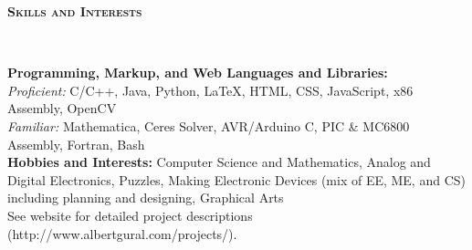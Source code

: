 \documentclass{article}
\newenvironment{changemargin}[2]{%
  \begin{list}{}{%
    \setlength{\topsep}{0pt}%
    \setlength{\leftmargin}{#1}%
    \setlength{\rightmargin}{#2}%
    \setlength{\listparindent}{\parindent}%
    \setlength{\itemindent}{\parindent}%
    \setlength{\parsep}{\parskip}%
  }%
  \item[]}{\end{list}
}
\newcommand{\lineover}{
	\begin{changemargin}{-0.05in}{-0.05in}
		\vspace*{-8pt}
		\hrulefill \\
		\vspace*{-2pt}
	\end{changemargin}
}
\newcommand{\header}[1]{
	\begin{changemargin}{-0.5in}{-0.5in}
		{\large \textbf{\scshape{#1}}}\\
  	\lineover
	\end{changemargin}
}
\newenvironment{body} {
	\vspace*{-16pt}
	\begin{changemargin}{-0.25in}{-0.5in}
  }	
	{\end{changemargin}
}
\begin{document}
\smallskip


\header{Skills and Interests}

\begin{body}
	\vspace{14pt}
	\textbf{Programming, Markup, and Web Languages and Libraries:} \\
	\textit{Proficient:} C/C++, Java, Python, \LaTeX, HTML, CSS, JavaScript, x86 Assembly, OpenCV \\ 
	\textit{Familiar:} Mathematica, Ceres Solver, AVR/Arduino C, PIC \& MC6800 Assembly, Fortran, Bash \\
	\medskip
	\textbf{Hobbies and Interests:} Computer Science and Mathematics, Analog and Digital Electronics, Puzzles, Making Electronic Devices (mix of EE, ME, and CS) including planning and designing, Graphical Arts \\ See website for detailed project descriptions (http://www.albertgural.com/projects/). \\
\end{body}

\smallskip
\end{document}
